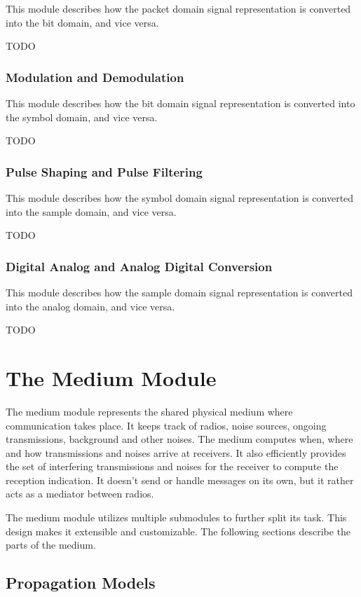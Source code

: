 This module describes how the packet domain signal representation is converted
into the bit domain, and vice versa.

TODO

\subsubsection{Modulation and Demodulation}

This module describes how the bit domain signal representation is converted into
the symbol domain, and vice versa.

TODO

\subsubsection{Pulse Shaping and Pulse Filtering}

This module describes how the symbol domain signal representation is converted
into the sample domain, and vice versa.

TODO

\subsubsection{Digital Analog and Analog Digital Conversion}

This module describes how the sample domain signal representation is converted
into the analog domain, and vice versa.

TODO
\fi

\section{The Medium Module}

The medium module represents the shared physical medium where communication
takes place. It keeps track of radios, noise sources, ongoing transmissions,
background and other noises. The medium computes when, where and how
transmissions and noises arrive at receivers. It also efficiently provides the
set of interfering transmissions and noises for the receiver to compute the
reception indication. It doesn't send or handle messages on its own, but it
rather acts as a mediator between radios.

The medium module utilizes multiple submodules to further split its task. This
design  makes it extensible and customizable. The following sections describe
the parts of the medium.

\subsection{Propagation Models}

